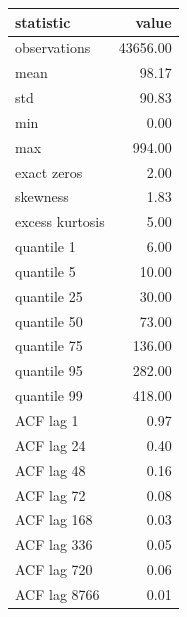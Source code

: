 \begin{tabular}{lr}
\toprule
statistic & value \\
\midrule
observations & 43656.00 \\
mean & 98.17 \\
std & 90.83 \\
min & 0.00 \\
max & 994.00 \\
exact zeros & 2.00 \\
skewness & 1.83 \\
excess kurtosis & 5.00 \\
quantile 1 & 6.00 \\
quantile 5 & 10.00 \\
quantile 25 & 30.00 \\
quantile 50 & 73.00 \\
quantile 75 & 136.00 \\
quantile 95 & 282.00 \\
quantile 99 & 418.00 \\
ACF lag 1 & 0.97 \\
ACF lag 24 & 0.40 \\
ACF lag 48 & 0.16 \\
ACF lag 72 & 0.08 \\
ACF lag 168 & 0.03 \\
ACF lag 336 & 0.05 \\
ACF lag 720 & 0.06 \\
ACF lag 8766 & 0.01 \\
\bottomrule
\end{tabular}
